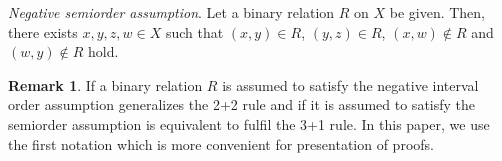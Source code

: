 \documentclass{article}
\theoremstyle{definition}
\newtheorem{remark}[theorem]{Remark}
\begin{document}
\par\smallskip\par\noindent
{\it Negative semiorder assumption}. 
Let a binary relation $R$ on $X$ be given. Then, there exists
$x,y, z, w\in X$ such that
$(x,y)\in R$, $(y,z)\in R$, $(x,w)\notin R$ and $(w,y)\notin R$ hold.

\begin{remark}\label{slem}{\rm If a binary relation $R$
is assumed to satisfy the negative interval order assumption
generalizes the 2+2 rule and if
it is assumed to satisfy the semiorder assumption
is equivalent to fulfil the 3+1 rule.
In this paper, we use the first notation which is more convenient for presentation of proofs.
}
\end{remark}
\end{document}
